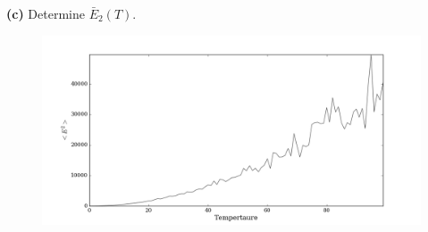 \documentclass{article}
\begin{document}
\textbf{(c)} Determine $\bar{E}_{2}(T)$. 

\begin{figure}[H]
\begin{center}
\includegraphics[width=16cm]{../output/quantum2D/expected_sq.png} 
\end{center}
\end{figure}
\end{document}
